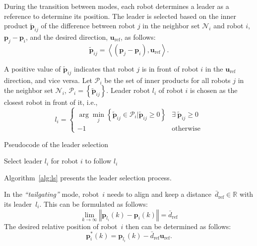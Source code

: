 During the transition between modes, each robot determines a leader as a reference to determine its position. The leader is selected based on the inner product $\tilde{\mathbf{p}}_{ij}$ of the difference between robot $j$ in the neighbor set $\mathcal{N}_i$ and robot $i$, $\mathbf{p}_j-\mathbf{p}_i$, and the desired direction, $\mathbf{u}_\text{ref}$, as follows:
\begin{equation}
    \tilde{\mathbf{p}}_{ij} = \left\langle (\mathbf{p}_j-\mathbf{p}_i),\mathbf{u}_\text{ref}\right\rangle.
    \label{eqn:tildep}
\end{equation}

A positive value of $\tilde{\mathbf{p}}_{ij}$ indicates that robot $j$ is in front of robot $i$ in the $\mathbf{u}_\text{ref}$ direction, and vice versa. Let $\mathcal{P}_i$ be the set of inner products for all robots $j$ in the neighbor set $\mathcal{N}_i$, $\mathcal{P}_i=\left\{\tilde{\mathbf{p}}_{ij}\right\}$. Leader robot ${l_i}$ of robot $i$ is chosen as the closest robot in front of it, i.e.,
\begin{equation}
     l_i=\begin{cases}
    \arg\min_{j}\left\{\tilde{\mathbf{p}}_{ij}\in\mathcal{P}_i\vert\tilde{\mathbf{p}}_{ij}\geq0\right\} & \exists~\tilde{\mathbf{p}}_{ij}\geq0\\ 
    -1 & \text{otherwise}
     \end{cases}
    \label{eqn:li}
\end{equation}

\begin{algorithm}
\caption{Pseudocode of the leader selection}
\label{alg:ls}
Select leader $l_i$ for robot $i$ to follow
\Return $l_i$\;
\end{algorithm}

Algorithm~\ref{alg:ls} presents the leader selection process. 

In the \textit{``tailgating''} mode, robot~$i$ needs to align and keep a distance~$\bar{d}_\text{ref}\in\mathbb{R}$ with its leader~$l_i$. This can be formulated as follows:
\begin{equation}
    \lim_{k\to\infty}{\left\Vert \mathbf{p}_{l_i}(k)-\mathbf{p}_i(k)\right\Vert}=\bar{d}_\text{ref}
    \label{eqn:tailcon}
\end{equation}
The desired relative position of robot~$i$ then can be determined as follows:
\begin{equation}
    \mathbf{p}_i^*(k)= \mathbf{p}_{l_i}(k)-\bar{d}_\text{ref}\mathbf{u}_\text{ref}.
    \label{eqn:tailgating}
\end{equation}


